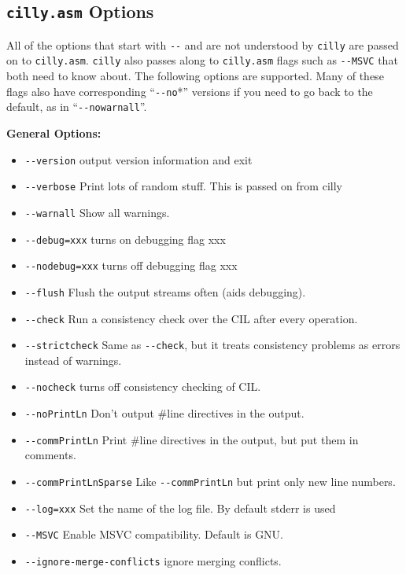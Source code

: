 \documentclass[letterpaper]{article}
\def\t#1{{\tt #1}}
\begin{document}
 
  \subsection{\t{cilly.asm} Options}
  \label{sec-cilly-asm-options}

 All of the options that start with \t{-{}-} and are not understood by
\t{cilly} are passed on to \t{cilly.asm}.   \t{cilly} also passes along to
\t{cilly.asm} flags such as \t{-{}-MSVC} that both need to know
about.  The following options are supported.  Many of these flags also
have corresponding ``\t{-{}-no}*'' versions if you need to go back to
the default, as in ``\t{-{}-nowarnall}''.

\hspace*{2cm} {\bf General Options:}
\begin{itemize}
  \item \t{-{}-version} output version information and exit
  \item \t{-{}-verbose} Print lots of random stuff. This is passed on from cilly
  \item \t{-{}-warnall} Show all warnings.
  \item \t{-{}-debug=xxx} turns on debugging flag xxx
  \item \t{-{}-nodebug=xxx} turns off debugging flag xxx
  \item \t{-{}-flush} Flush the output streams often (aids debugging).
  \item \t{-{}-check} Run a consistency check over the CIL after every operation.
  \item \t{-{}-strictcheck} Same as \t{-{}-check}, but it treats
    consistency problems as errors instead of warnings.
  \item \t{-{}-nocheck} turns off consistency checking of CIL.
  \item \t{-{}-noPrintLn} Don't output \#line directives in the output.
  \item \t{-{}-commPrintLn} Print \#line directives in the output, but
    put them in comments.
  \item \t{-{}-commPrintLnSparse} Like \t{-{}-commPrintLn} but print only new
         line numbers.
  \item \t{-{}-log=xxx} Set the name of the log file.  By default stderr is used
  \item \t{-{}-MSVC} Enable MSVC compatibility. Default is GNU.
  \item \t{-{}-ignore-merge-conflicts} ignore merging conflicts.

\end{itemize}
\end{document}
